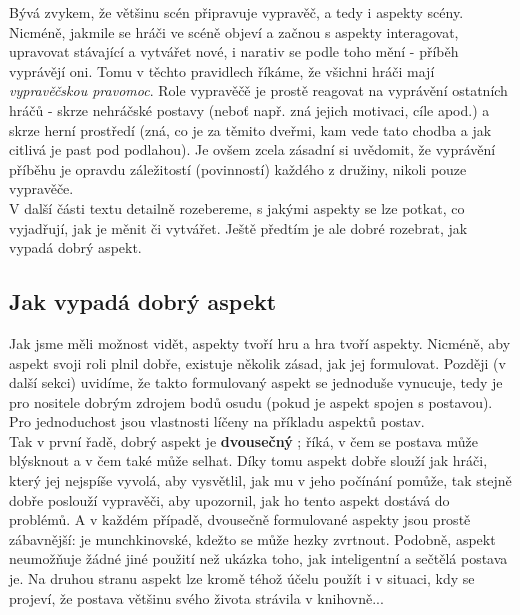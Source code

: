 \documentclass[../main.tex]{subfiles}
\begin{document}
Bývá zvykem, že většinu scén připravuje vypravěč, a tedy i aspekty scény. Nicméně, jakmile se hráči ve scéně objeví a začnou s aspekty interagovat, upravovat stávající a vytvářet nové, i narativ se podle toho mění - příběh vyprávějí oni. Tomu v těchto pravidlech říkáme, že všichni hráči mají \emph{vypravěčskou pravomoc}. Role vypravěčě je prostě reagovat na vyprávění ostatních hráčů - skrze nehráčské postavy (neboť např. zná jejich motivaci, cíle apod.) a skrze herní prostředí (zná, co je za těmito dveřmi, kam vede tato chodba a jak citlivá je past pod podlahou). Je ovšem zcela zásadní si uvědomit, že vyprávění příběhu je opravdu záležitostí (povinností) každého z družiny, nikoli pouze vypravěče.  \\

V další části textu detailně rozebereme, s jakými aspekty se lze potkat, co vyjadřují, jak je měnit či vytvářet. Ještě předtím je ale dobré rozebrat, jak vypadá dobrý aspekt.

\subsection{Jak vypadá dobrý aspekt}
\label{sec:jakvypadadobry}

Jak jsme měli možnost vidět, aspekty tvoří hru a hra tvoří aspekty. Nicméně, aby aspekt svoji roli plnil dobře, existuje několik zásad, jak jej formulovat. Později (v další sekci) uvidíme, že takto formulovaný aspekt se jednoduše vynucuje, tedy je pro nositele dobrým zdrojem bodů osudu (pokud je aspekt spojen s postavou). Pro jednoduchost jsou vlastnosti líčeny na příkladu aspektů postav.\\

Tak v první řadě, dobrý aspekt je \textbf{dvousečný} ; říká, v čem se postava může blýsknout a v čem také může selhat. Díky tomu aspekt dobře slouží jak hráči, který jej nejspíše vyvolá, aby vysvětlil, jak mu v jeho počínání pomůže, tak stejně dobře poslouží vypravěči, aby upozornil, jak ho tento aspekt dostává do problémů. A v každém případě, dvousečně formulované aspekty jsou prostě zábavnější:  je munchkinovské, kdežto  se může hezky zvrtnout. Podobně, aspekt  neumožňuje žádné jiné použití než ukázka toho, jak inteligentní a sečtělá postava je. Na druhou stranu aspekt  lze kromě téhož účelu použít i v situaci, kdy se projeví, že postava většinu svého života strávila v knihovně...
\end{document}
